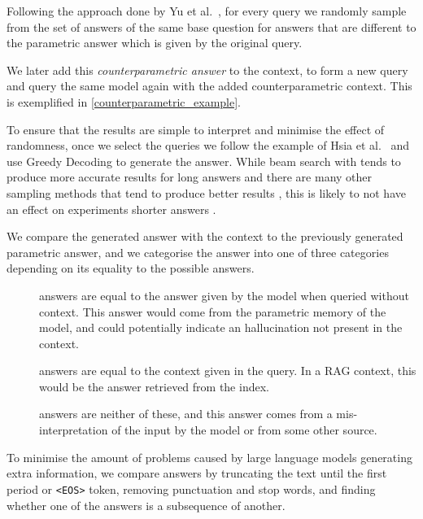 Following the approach done by Yu et al.\ \cite{factual_recall}, for every query we randomly sample from the set of answers of the same base question for answers that are different to the parametric answer which is given by the original query.

We later add this \emph{counterparametric answer} to the context, to form a new query and query the same model again with the added counterparametric context.
This is exemplified in \cref{counterparametric_example}.

To ensure that the results are simple to interpret and minimise the effect of randomness, once we select the queries we follow the example of Hsia et al.\ \cite{ragged} and use Greedy Decoding to generate the answer.
While beam search with tends to produce more accurate results for long answers \cite{sutskever_seq2seqlearning,wu_mltranslation} and there are many other sampling methods that tend to produce better results \cite{text_degeneration}, this is likely to not have an effect on experiments shorter answers \cite{t5}.

We compare the generated answer with the context to the previously generated parametric answer, and we categorise the answer into one of three categories depending on its equality to the possible answers.
\begin{description}
	\item[\Parametric{}] answers are equal to the answer given by the model when queried without context.
		This answer would come from the parametric memory of the model, and could potentially indicate an hallucination not present in the context.
	\item[\Contextual{}] answers are equal to the context given in the query.
		In a RAG context, this would be the answer retrieved from the index.
	\item[\Other] answers are neither of these, and this answer comes from a mis-interpretation of the input by the model or from some other source.
\end{description}

To minimise the amount of problems caused by large language models generating extra information, we compare answers by truncating the text until the first period or \texttt{<EOS>} token, removing punctuation and stop words, and finding whether one of the answers is a subsequence of another.

